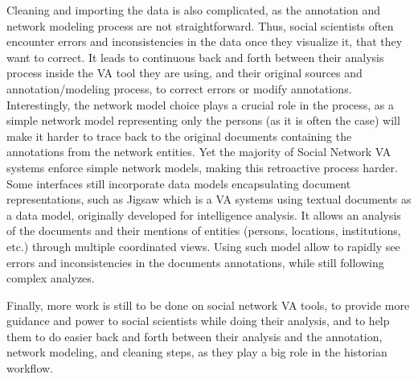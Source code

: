 Cleaning and importing the data is also complicated, as the annotation and network modeling process are not straightforward.
Thus, social scientists often encounter errors and inconsistencies in the data once they visualize it, that they want to correct.
It leads to continuous back and forth between their analysis process inside the VA tool they are using, and their original sources and annotation/modeling process, to correct errors or modify annotations.
Interestingly, the network model choice plays a crucial role in the process, as a simple network model representing only the persons (as it is often the case) will make it harder to trace back to the original documents containing the annotations from the network entities.
Yet the majority of Social Network VA systems enforce simple network models, making this retroactive process harder.
Some interfaces still incorporate data models encapsulating document representations, such as Jigsaw \cite{staskoJigsawSupportingInvestigative2008} which is a VA systems using textual documents as a data model, originally developed for intelligence analysis.
It allows an analysis of the documents and their mentions of entities (persons, locations, institutions, etc.) through multiple coordinated views.
Using such model allow to rapidly see errors and inconsistencies in the documents annotations, while still following complex analyzes.

Finally, more work is still to be done on social network VA tools, to provide more guidance and power to social scientists while doing their analysis, and to help them to do easier back and forth between their analysis and the annotation, network modeling, and cleaning steps, as they play a big role in the historian workflow.
